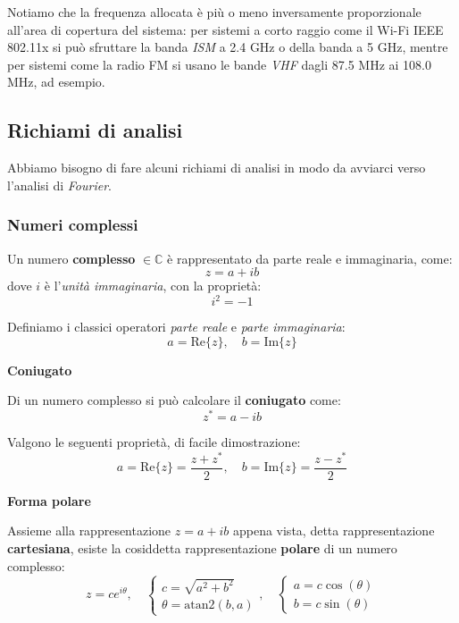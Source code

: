 \documentclass[a4paper,11pt]{article}
\begin{document}
Notiamo che la frequenza allocata è più o meno inversamente proporzionale all'area di copertura del sistema: per sistemi a corto raggio come il Wi-Fi IEEE 802.11x si può sfruttare la banda \textit{ISM} a 2.4 GHz o della banda a 5 GHz, mentre per sistemi come la radio FM si usano le bande \textit{VHF} dagli 87.5 MHz ai 108.0 MHz, ad esempio.

\subsection{Richiami di analisi}
Abbiamo bisogno di fare alcuni richiami di analisi in modo da avviarci verso l'analisi di \textit{Fourier}.

\subsubsection{Numeri complessi}
Un numero \textbf{complesso} $\in \mathbb{C}$ è rappresentato da parte reale e immaginaria, come:
$$
z = a + ib
$$
dove $i$ è l'\textit{unità immaginaria}, con la proprietà:
$$
i^2 = -1
$$

Definiamo i classici operatori \textit{parte reale} e \textit{parte immaginaria}:
$$
a = \mathrm{Re}\{z\}, \quad b = \mathrm{Im}\{z\}
$$

\par\smallskip

\noindent
\textbf{\textsf{Coniugato}}

\noindent
Di un numero complesso si può calcolare il \textbf{coniugato} come:
$$
z^* = a - ib
$$

Valgono le seguenti proprietà, di facile dimostrazione:
$$
a = \mathrm{Re}\{z\} = \frac{z + z^*}{2}, \quad b = \mathrm{Im}\{z\} = \frac{z - z^*}{2}
$$

\par\smallskip

\noindent
\textbf{\textsf{Forma polare}}

\noindent
Assieme alla rappresentazione $z = a + ib$ appena vista, detta rappresentazione \textbf{cartesiana}, esiste la cosiddetta rappresentazione \textbf{polare} di un numero complesso:
$$
z = c e^{i \theta}, \quad
\begin{cases}
	c = \sqrt{a^2 + b^2} \\
	\theta = \mathrm{atan2}(b, a)
\end{cases}, \quad
\begin{cases}
	a = c \cos(\theta) \\
	b = c \sin(\theta)
\end{cases}
$$
\end{document}
